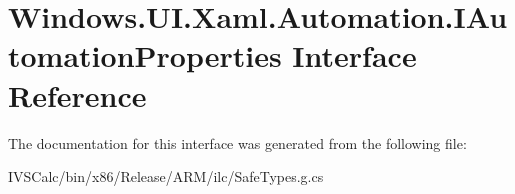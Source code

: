\hypertarget{interface_windows_1_1_u_i_1_1_xaml_1_1_automation_1_1_i_automation_properties}{}\section{Windows.\+U\+I.\+Xaml.\+Automation.\+I\+Automation\+Properties Interface Reference}
\label{interface_windows_1_1_u_i_1_1_xaml_1_1_automation_1_1_i_automation_properties}


The documentation for this interface was generated from the following file\+:\begin{DoxyCompactItemize}
\item 
I\+V\+S\+Calc/bin/x86/\+Release/\+A\+R\+M/ilc/Safe\+Types.\+g.\+cs\end{DoxyCompactItemize}
